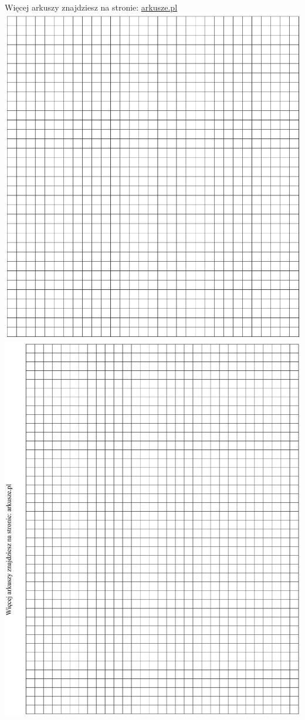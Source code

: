 \documentclass[10pt]{article}
\begin{document}
Więcej arkuszy znajdziesz na stronie: \href{http://arkusze.pl}{arkusze.pl}\\
\includegraphics[max width=\textwidth, center]{2024_11_21_8206013b40ecc9b11a30g-16(1)}\\
\includegraphics[max width=\textwidth, center]{2024_11_21_8206013b40ecc9b11a30g-17}
\end{document}
